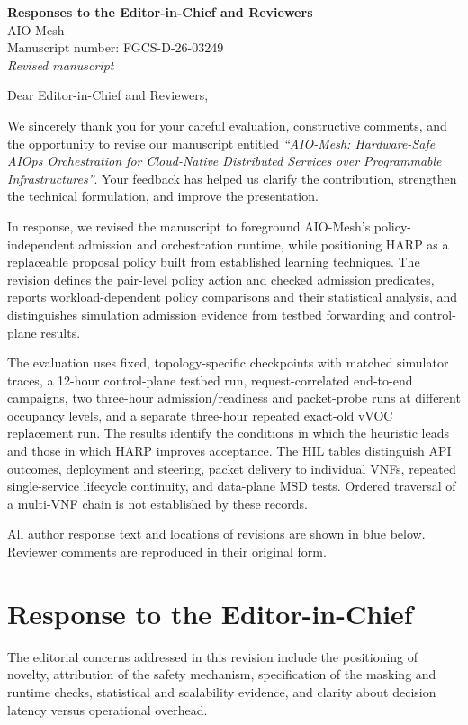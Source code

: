 \documentclass[11pt]{article}
\newcounter{reviewer}
\newcounter{comment}[reviewer]
\begin{document}
\begin{center}
{\LARGE\bfseries Responses to the Editor-in-Chief and Reviewers}\\[3mm]
{\large AIO-Mesh}\\[2mm]
Manuscript number: FGCS-D-26-03249\\[1mm]\textit{Revised manuscript}
\end{center}
Dear Editor-in-Chief and Reviewers,

We sincerely thank you for your careful evaluation, constructive comments, and the opportunity to revise our manuscript entitled \textit{``AIO-Mesh: Hardware-Safe AIOps Orchestration for Cloud-Native Distributed Services over Programmable Infrastructures''}. Your feedback has helped us clarify the contribution, strengthen the technical formulation, and improve the presentation.

\textcolor{replyblue}{In response, we revised the manuscript to foreground AIO-Mesh's policy-independent admission and orchestration runtime, while positioning HARP as a replaceable proposal policy built from established learning techniques. The revision defines the pair-level policy action and checked admission predicates, reports workload-dependent policy comparisons and their statistical analysis, and distinguishes simulation admission evidence from testbed forwarding and control-plane results.}

\textcolor{replyblue}{The evaluation uses fixed, topology-specific checkpoints with matched simulator traces, a 12-hour control-plane testbed run, request-correlated end-to-end campaigns, two three-hour admission/readiness and packet-probe runs at different occupancy levels, and a separate three-hour repeated exact-old vVOC replacement run. The results identify the conditions in which the heuristic leads and those in which HARP improves acceptance. The HIL tables distinguish API outcomes, deployment and steering, packet delivery to individual VNFs, repeated single-service lifecycle continuity, and data-plane MSD tests. Ordered traversal of a multi-VNF chain is not established by these records.}

\textcolor{replyblue}{All author response text and locations of revisions are shown in blue below. Reviewer comments are reproduced in their original form.}

\section*{Response to the Editor-in-Chief}
The editorial concerns addressed in this revision include the positioning of novelty, attribution of the safety mechanism, specification of the masking and runtime checks, statistical and scalability evidence, and clarity about decision latency versus operational overhead.
\end{document}
